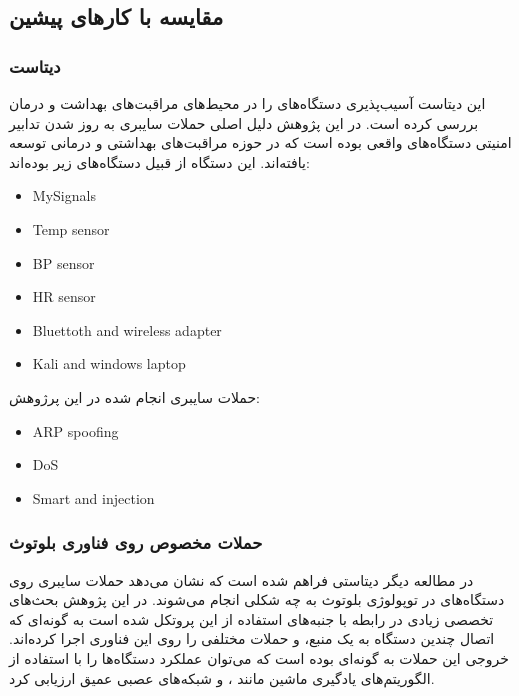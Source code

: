 \subsection{مقایسه  با کار‌های پیشین}

\subsubsection{دیتاست }

این دیتاست \cite{ahmed2021ecu} آسیب‌پذیری دستگاه‌های  را در محیط‌های
مراقبت‌های بهداشت و درمان بررسی کرده است. در این پژوهش دلیل اصلی حملات سایبری به
روز شدن تدابیر امنیتی دستگاه‌های واقعی بوده است که در حوزه مراقبت‌های بهداشتی و
درمانی توسعه یافته‌اند. این دستگاه از قبیل دستگاه‌های زیر بوده‌اند:

\begin{LTR}
    \begin{itemize}
        \item MySignals
        \item Temp sensor
        \item BP sensor
        \item HR sensor
        \item Bluettoth and wireless adapter
        \item Kali and windows laptop
    \end{itemize}
\end{LTR}

حملات سایبری انجام شده در این پرژوهش:

\begin{LTR}
    \begin{itemize}
        \item ARP spoofing
        \item DoS
        \item Smart and injection
    \end{itemize}
\end{LTR}

\subsubsection{حملات مخصوص روی فناوری بلوتوث}

در مطالعه دیگر \cite{zubair2022secure,skhs-0b39-21} دیتاستی فراهم شده است که
نشان می‌دهد حملات سایبری روی دستگاه‌های  در توپولوژی بلوتوث به چه شکلی
انجام می‌شوند. در این پژوهش بحث‌های تخصصی زیادی در رابطه با جنبه‌های استفاده از
این پروتکل شده است به گونه‌ای که اتصال چندین دستگاه به یک منبع، و حملات مختلفی
را روی این فناوری اجرا کرده‌اند. خروجی این حملات به گونه‌ای بوده است که می‌توان
عملکرد دستگاه‌ها را با استفاده از الگوریتم‌های یادگیری ماشین مانند ،  و شبکه‌های عصبی عمیق ارزیابی کرد.

